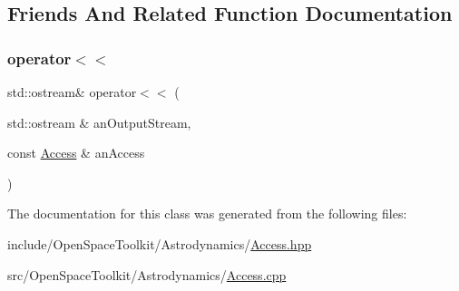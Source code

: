 \subsection{Friends And Related Function Documentation}
\mbox{\label{classostk_1_1astro_1_1_access_a84eabd1ef8d3eeff0b6a80851727a2b4}} 
\subsubsection{\texorpdfstring{operator$<$$<$}{operator<<}}
{\footnotesize\ttfamily std\+::ostream\& operator$<$$<$ (\begin{DoxyParamCaption}\item[{std\+::ostream \&}]{an\+Output\+Stream,  }\item[{const \hyperlink{classostk_1_1astro_1_1_access}{Access} \&}]{an\+Access }\end{DoxyParamCaption})\hspace{0.3cm}{\ttfamily [friend]}}



The documentation for this class was generated from the following files\+:\begin{DoxyCompactItemize}
\item 
include/\+Open\+Space\+Toolkit/\+Astrodynamics/\hyperlink{_access_8hpp}{Access.\+hpp}\item 
src/\+Open\+Space\+Toolkit/\+Astrodynamics/\hyperlink{_access_8cpp}{Access.\+cpp}\end{DoxyCompactItemize}
